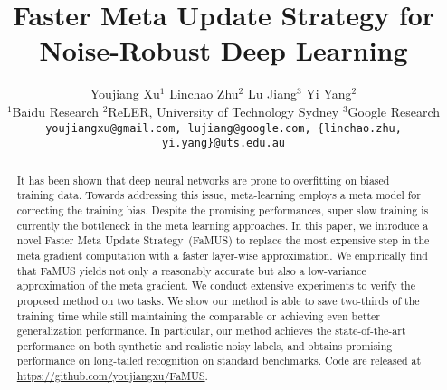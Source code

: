 \documentclass[final]{cvpr}
\newcommand{\methodname}{Faster Meta Update Strategy}
\newcommand{\methodnameabbre}{FaMUS}
\begin{document}
\title{Faster Meta Update Strategy for Noise-Robust Deep Learning}

\author{Youjiang Xu$^1$ \hspace{12pt} Linchao Zhu$^2$ \hspace{12pt} Lu Jiang$^3$ \hspace{12pt}  Yi Yang$^2$\\
$^1$Baidu Research $^2$ReLER, University of Technology Sydney $^3$Google Research\\
{\tt\small youjiangxu@gmail.com, lujiang@google.com, \{linchao.zhu, yi.yang\}@uts.edu.au}
}

\maketitle
\thispagestyle{empty} 






\begin{abstract}
It has been shown that deep neural networks are prone to overfitting on biased training data. Towards addressing this issue, meta-learning employs a meta model for correcting the training bias. 
Despite the promising performances, super slow training is currently the bottleneck in the meta learning approaches.
In this paper, we introduce a novel \methodname\ (\methodnameabbre) to replace the most expensive step in the meta gradient computation with a faster layer-wise approximation. We empirically find that \methodnameabbre\xspace yields not only a reasonably accurate but also a low-variance approximation of the meta gradient.
We conduct extensive experiments to verify the proposed method on two tasks. We show our method is able to save two-thirds of the training time while still maintaining the comparable or achieving even better generalization performance. In particular, our method achieves the state-of-the-art performance on
both synthetic and realistic noisy labels, and obtains promising performance on long-tailed recognition on standard benchmarks. Code are released at {\small \url{https://github.com/youjiangxu/FaMUS}}.

\end{abstract} 
\end{document}
